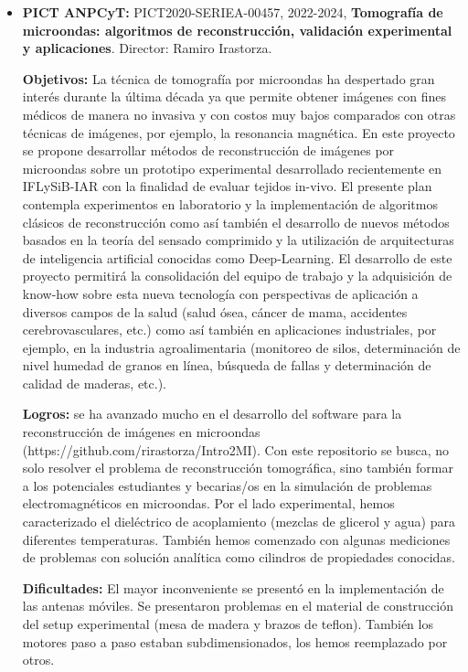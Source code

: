 \documentclass[a4paper,11pt,twoside,final,titlepage,onecolumn,openright]{report}
\begin{document}
\begin{itemize}
 {\bf Dificultades:} no se produjeron dificultades en el desarrollo del proyecto. 

\item \textbf{PICT ANPCyT:} PICT2020-SERIEA-00457, 2022-2024, {\bf Tomografía de microondas: algoritmos de reconstrucción, validación experimental y aplicaciones}. Director: Ramiro Irastorza.

    \textbf{Objetivos:} La técnica de tomografía por microondas ha despertado gran interés durante la última década ya que permite obtener imágenes con fines médicos de manera no invasiva y con costos muy bajos comparados con otras técnicas de imágenes, por ejemplo, la resonancia magnética. En este proyecto se propone desarrollar métodos de reconstrucción de imágenes por microondas sobre un prototipo experimental desarrollado recientemente en IFLySiB-IAR con la finalidad de evaluar tejidos in-vivo. El presente plan contempla experimentos en laboratorio y la implementación de algoritmos clásicos de reconstrucción como así también el desarrollo de nuevos métodos basados en la teoría del sensado comprimido y la utilización de arquitecturas de inteligencia artificial conocidas como Deep-Learning. El desarrollo de este proyecto permitirá la consolidación del equipo de trabajo y la adquisición de know-how sobre esta nueva tecnología con perspectivas de aplicación a diversos campos de la salud (salud ósea, cáncer de mama, accidentes cerebrovasculares, etc.) como así también en aplicaciones industriales, por ejemplo, en la industria agroalimentaria (monitoreo de silos, determinación de nivel humedad de granos en línea, búsqueda de fallas y determinación de calidad de maderas, etc.).

    \textbf{Logros:} se ha avanzado mucho en el desarrollo del software para la reconstrucción de imágenes en microondas (https://github.com/rirastorza/Intro2MI). Con este repositorio se busca, no solo resolver el problema de reconstrucción tomográfica, sino también formar a los potenciales estudiantes y becarias/os en la simulación de problemas electromagnéticos en microondas. Por el lado experimental, hemos caracterizado el dieléctrico de acoplamiento (mezclas de glicerol y agua) para diferentes temperaturas. También hemos comenzado con algunas mediciones de problemas con solución analítica como cilindros de propiedades conocidas.

    \textbf{Dificultades:} El mayor inconveniente se presentó en la implementación de las antenas móviles. Se presentaron problemas en el material de construcción del setup experimental (mesa de madera y brazos de teflon). También los motores paso a paso estaban subdimensionados, los hemos reemplazado por otros.


\end{itemize}
\end{document}
